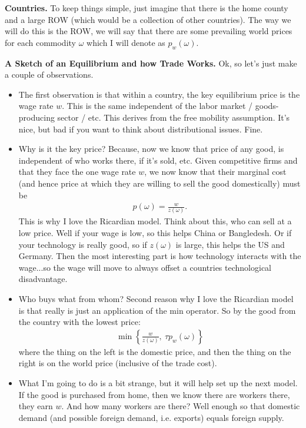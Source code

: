\documentclass[pdftex,12pt]{article}
\begin{document}
\medskip
\noindent \textbf{Countries.} To keep things simple, just imagine that there is the home county and a large ROW (which would be a collection of other countries). The way we will do this is the ROW, we will say that there are some prevailing world prices for each commodity $\omega$ which I will denote as $p_w(\omega)$.

\medskip
\noindent \textbf{A Sketch of an Equilibrium and how Trade Works.} Ok, so let's just make a couple of observations.

\begin{itemize}
\item The first observation is that within a country, the key equilibrium price is the wage rate $w$. This is the same independent of the labor market / goods-producing sector / etc. This derives from the free mobility assumption. It's nice, but bad if you want to think about distributional issues. Fine.

\item Why is it the key price? Because, now we know that price of any good, is independent of who works there, if it's sold, etc. Given competitive firms and that they face the one wage rate $w$, we now know that their marginal cost (and hence price at which they are willing to sell the good domestically) must be
    \begin{align}
    p(\omega) = \frac{w}{z(\omega)}.
    \label{eq:ek_wage}
    \end{align}
    This is why I love the Ricardian model. Think about this, who can sell at a low price. Well if your wage is low, so this helps China or Bangledesh. Or if your technology is really good, so if $z(\omega)$ is large, this helps the US and Germany. Then the most interesting part is how technology interacts with the wage...so the wage will move to always offset a countries technological disadvantage.

\item Who buys what from whom? Second reason why I love the Ricardian model is that really is just an application of the min operator. So by the good from the country with the lowest price:
    \begin{align}
    \min\left\{ \frac{w}{z(\omega)} , \ \tau p_w(\omega) \right\}
    \end{align}
where the thing on the left is the domestic price, and then the thing on the right is on the world price (inclusive of the trade cost). 

\item What I'm going to do is a bit strange, but it will help set up the next model. If the good is purchased from home, then we know there are workers there, they earn $w$. And how many workers are there? Well enough so that domestic demand (and possible foreign demand, i.e. exports) equals foreign supply. 
    

\end{itemize}
\end{document}
